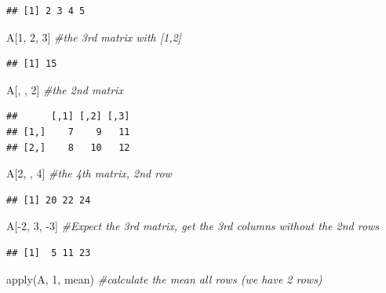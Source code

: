 \documentclass[
]{book}
\newenvironment{Shaded}{\begin{snugshade}}{\end{snugshade}}
\newcommand{\CommentTok}[1]{\textcolor[rgb]{0.56,0.35,0.01}{\textit{#1}}}
\newcommand{\DecValTok}[1]{\textcolor[rgb]{0.00,0.00,0.81}{#1}}
\newcommand{\FunctionTok}[1]{\textcolor[rgb]{0.00,0.00,0.00}{#1}}
\newcommand{\NormalTok}[1]{#1}
\newcommand{\SpecialCharTok}[1]{\textcolor[rgb]{0.00,0.00,0.00}{#1}}
\begin{document}
\begin{verbatim}
## [1] 2 3 4 5
\end{verbatim}

\begin{Shaded}
\begin{Highlighting}[]
\NormalTok{A[}\DecValTok{1}\NormalTok{, }\DecValTok{2}\NormalTok{, }\DecValTok{3}\NormalTok{]     }\CommentTok{\#the 3rd matrix with [1,2]}
\end{Highlighting}
\end{Shaded}

\begin{verbatim}
## [1] 15
\end{verbatim}

\begin{Shaded}
\begin{Highlighting}[]
\NormalTok{A[, , }\DecValTok{2}\NormalTok{]       }\CommentTok{\#the 2nd matrix}
\end{Highlighting}
\end{Shaded}

\begin{verbatim}
##      [,1] [,2] [,3]
## [1,]    7    9   11
## [2,]    8   10   12
\end{verbatim}

\begin{Shaded}
\begin{Highlighting}[]
\NormalTok{A[}\DecValTok{2}\NormalTok{, , }\DecValTok{4}\NormalTok{]      }\CommentTok{\#the 4th matrix, 2nd row}
\end{Highlighting}
\end{Shaded}

\begin{verbatim}
## [1] 20 22 24
\end{verbatim}

\begin{Shaded}
\begin{Highlighting}[]
\NormalTok{A[}\SpecialCharTok{{-}}\DecValTok{2}\NormalTok{, }\DecValTok{3}\NormalTok{, }\SpecialCharTok{{-}}\DecValTok{3}\NormalTok{]   }\CommentTok{\#Expect the 3rd matrix, get the 3rd columns without the 2nd rows}
\end{Highlighting}
\end{Shaded}

\begin{verbatim}
## [1]  5 11 23
\end{verbatim}

\begin{Shaded}
\begin{Highlighting}[]
\FunctionTok{apply}\NormalTok{(A, }\DecValTok{1}\NormalTok{, mean)      }\CommentTok{\#calculate the mean all rows (we have 2 rows)}
\end{Highlighting}
\end{Shaded}
\end{document}
